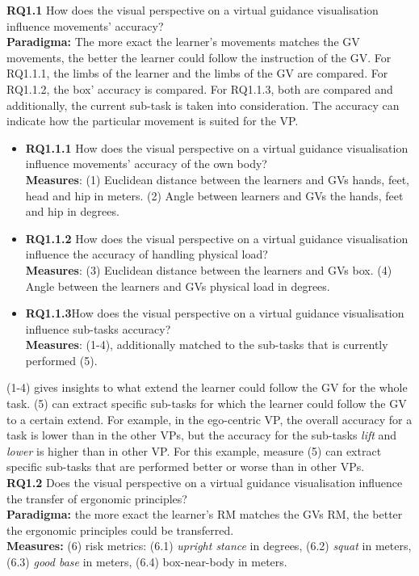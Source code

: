 \textbf{RQ1.1} How does the visual perspective on a virtual guidance visualisation influence movements' accuracy?\\
\textbf{Paradigma:} The more exact the learner's movements matches the GV movements, the better the learner could follow the instruction of the GV. For RQ1.1.1, the limbs of the learner and the limbs of the GV are compared. For RQ1.1.2, the box' accuracy is compared. For RQ1.1.3, both are compared and additionally, the current sub-task is taken into consideration. The accuracy can indicate how the particular movement is suited for the VP.
\begin{itemize}
	\item[] \textbf{RQ1.1.1} How does the visual perspective on a virtual guidance visualisation influence movements' accuracy of the own body?\\
	\textbf{Measures}: (1) Euclidean distance between the learners and GVs hands, feet, head and hip in meters. (2) Angle between learners and GVs the hands, feet and hip in degrees.
	
	\item[] \textbf{RQ1.1.2} How does the visual perspective on a virtual guidance visualisation influence the accuracy of handling physical load?\\
	\textbf{Measures}: (3) Euclidean distance between the learners and GVs box. (4) Angle between the learners and GVs physical load in degrees.
	
	\item[] \textbf{RQ1.1.3}How does the visual perspective on a virtual guidance visualisation influence sub-tasks accuracy?\\
	\textbf{Measures}: (1-4), additionally matched to the sub-tasks that is currently performed (5).
\end{itemize}	
(1-4) gives insights to what extend the learner could follow the GV for the whole task. (5) can extract specific sub-tasks for which the learner could follow the GV to a certain extend. For example, in the ego-centric VP, the overall accuracy for a task is lower than in the other VPs, but the accuracy for the sub-tasks \textit{lift} and \textit{lower} is higher than in other VP. For this example, measure (5) can extract specific sub-tasks that are performed better or worse than in other VPs.\\

\textbf{RQ1.2} Does the visual perspective on a virtual guidance visualisation influence the transfer of ergonomic principles?\\
\textbf{Paradigma:} the more exact the learner's RM matches the GVs RM, the better the ergonomic principles could be transferred.\\
\textbf{Measures:} (6) risk metrics: (6.1) \textit{upright stance} in degrees, (6.2) \textit{squat} in meters, (6.3) \textit{good base} in meters, (6.4) box-near-body in meters.\\

